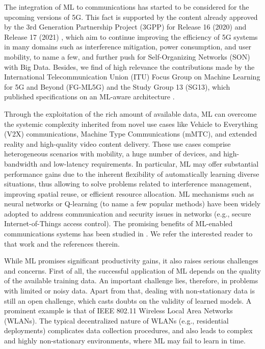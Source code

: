 \documentclass[journal]{IEEEtran}
\begin{document}
	The integration of ML to communications has started to be considered for the upcoming versions of 5G. This fact is supported by the content already approved by the 3rd Generation Partnership Project (3GPP) for Release 16 (2020) and Release 17 (2021) \cite{3gpp2019study}, which aim to continue improving the efficiency of 5G systems in many domains such as interference mitigation, power consumption, and user mobility, to name a few, and further push for Self-Organizing Networks (SON) with Big Data. Besides, we find of high relevance the contributions made by the International Telecommunication Union (ITU) Focus Group on Machine Learning for 5G and Beyond (FG-ML5G) and the Study Group 13 (SG13), which published specifications on an ML-aware architecture \cite{ITU3172, ITU3174}.
	
	Through the exploitation of the rich amount of available data, ML can overcome the systemic complexity inherited from novel use cases like Vehicle to Everything (V2X) communications, Machine Type Communications (mMTC), and extended reality and high-quality video content delivery. These use cases comprise heterogeneous scenarios with mobility, a huge number of devices, and high-bandwidth and low-latency requirements. In particular, ML may offer substantial performance gains due to the inherent flexibility of automatically learning diverse situations, thus allowing to solve problems related to interference management, improving spatial reuse, or efficient resource allocation. ML mechanisms such as neural networks or Q-learning (to name a few popular methods) have been widely adopted to address communication and security issues in networks (e.g., secure Internet-of-Things access control). The promising benefits of ML-enabled communications systems has been studied in \cite{itu_architecture}. We refer the interested reader to that work and the references therein.
	
	While ML promises significant productivity gains, it also raises serious challenges and concerns. First of all, the successful application of ML depends on the quality of the available training data. An important challenge lies, therefore, in problems with limited or noisy data. Apart from that, dealing with non-stationary data is still an open challenge, which casts doubts on the validity of learned models. A prominent example is that of IEEE 802.11 Wireless Local Area Networks (WLANs). The typical decentralized nature of WLANs (e.g., residential deployments) complicates data collection procedures, and also leads to complex and highly non-stationary environments, where ML may fail to learn in time.
	
\end{document}
